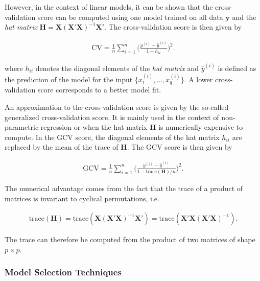 \documentclass[10pt,a4paper]{article}
\begin{document}
However, in the context of linear models, it can be shown that the cross-validation score can be computed using one model trained on all data $\boldsymbol{y}$ and the \emph{hat matrix} $\boldsymbol{H} = \boldsymbol{X}(\boldsymbol{X}'\boldsymbol{X})^{-1}\boldsymbol{X}'$. The cross-validation score is then given by

\begin{align} \label{eq:cross-validation}
	\text{CV} = \frac{1}{n} \sum_{i=1}^n\big( \frac{y^{(i)} - \hat y^{(i)}}{1 - h_{ii}}\big)^2.
\end{align}

where $h_{ii}$ denotes the diagonal elements of the \emph{hat matrix} and $\hat y^{(i)}$ is defined as the prediction of the model for the input $\{x^{(i)}_1, \dots, x^{(i)}_q \}$. A lower cross-validation score corresponds to a better model fit. \cite{golub1979}

An approximation to the cross-validation score is given by the so-called generalized cross-validation score. It is mainly used in the context of non-parametric regression or when the hat matrix $\boldsymbol{H}$ is numerically expensive to compute. In the GCV score, the diagonal elements of the hat matrix $h_{ii}$ are replaced by the mean of the trace of $\boldsymbol{H}$. The GCV score is then given by

\begin{align} \label{eq:generalizied-cross-validation}
	\text{GCV} = \frac{1}{n}\sum_{i=1}^n \Big( \frac{y^{(i)} - \hat y^{(i)}}{1 - \text{trace}(\boldsymbol{H})/n}\Big)^2.
\end{align}

The numerical advantage comes from the fact that the trace of a product of matrices is invariant to cyclical permutations, i.e.

\begin{align}
	\text{trace}(\boldsymbol{H}) = \text{trace}(\boldsymbol{X}(\boldsymbol{X}'\boldsymbol{X})^{-1}\boldsymbol{X}') =\text{trace}(\boldsymbol{X}'\boldsymbol{X}(\boldsymbol{X}'\boldsymbol{X})^{-1}).
\end{align} 
 
The trace can therefore be computed from the product of two matrices of shape $p\times p$. \cite{fahrmeir2013regression}

\subsubsection{Model Selection Techniques} \label{subsubsec:MST}
\end{document}
